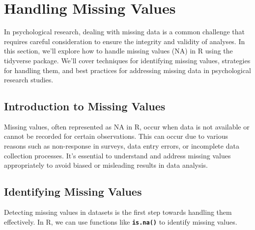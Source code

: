 \documentclass[
]{book}
\begin{document}
\section{Handling Missing Values}\label{handling-missing-values}

In psychological research, dealing with missing data is a common challenge that requires careful consideration to ensure the integrity and validity of analyses. In this section, we'll explore how to handle missing values (NA) in R using the tidyverse package. We'll cover techniques for identifying missing values, strategies for handling them, and best practices for addressing missing data in psychological research studies.

\subsection{\texorpdfstring{\textbf{Introduction to Missing Values}}{Introduction to Missing Values}}\label{introduction-to-missing-values}

Missing values, often represented as NA in R, occur when data is not available or cannot be recorded for certain observations. This can occur due to various reasons such as non-response in surveys, data entry errors, or incomplete data collection processes. It's essential to understand and address missing values appropriately to avoid biased or misleading results in data analysis.

\subsection{\texorpdfstring{\textbf{Identifying Missing Values}}{Identifying Missing Values}}\label{identifying-missing-values}

Detecting missing values in datasets is the first step towards handling them effectively. In R, we can use functions like \textbf{\texttt{is.na()}} to identify missing values.
\end{document}
